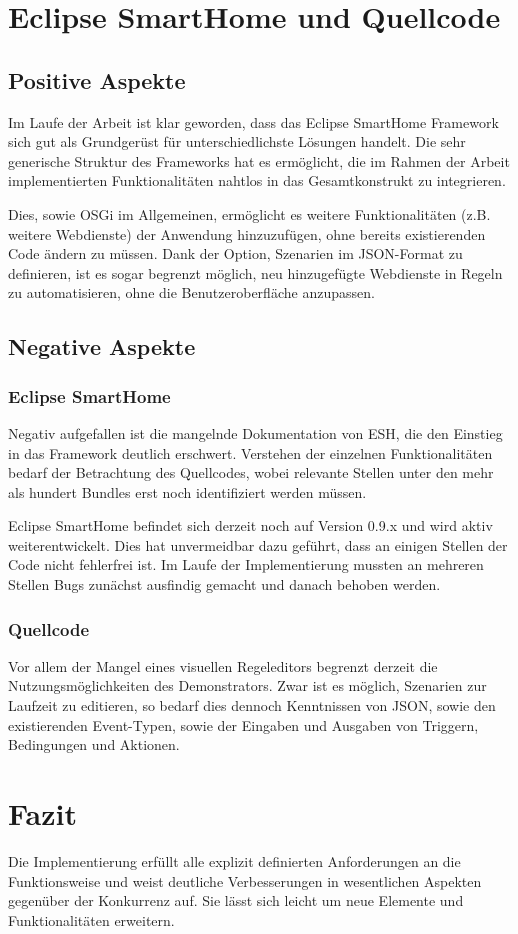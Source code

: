 \section{Eclipse SmartHome und Quellcode}
\subsection{Positive Aspekte}
Im Laufe der Arbeit ist klar geworden, dass das Eclipse SmartHome Framework sich gut als Grundgerüst für unterschiedlichste Lösungen handelt. Die sehr generische Struktur des Frameworks hat es ermöglicht, die im Rahmen der Arbeit implementierten Funktionalitäten nahtlos in das Gesamtkonstrukt zu integrieren. 

Dies, sowie OSGi im Allgemeinen, ermöglicht es weitere Funktionalitäten (z.B. weitere Webdienste) der Anwendung hinzuzufügen, ohne bereits existierenden Code ändern zu müssen. Dank der Option, Szenarien im JSON-Format zu definieren, ist es sogar begrenzt möglich, neu hinzugefügte Webdienste in Regeln zu automatisieren, ohne die Benutzeroberfläche anzupassen.

\subsection{Negative Aspekte}
\subsubsection{Eclipse SmartHome}
Negativ aufgefallen ist die mangelnde Dokumentation von ESH, die den Einstieg in das Framework deutlich erschwert. Verstehen der einzelnen Funktionalitäten bedarf der Betrachtung des Quellcodes, wobei relevante Stellen unter den mehr als hundert Bundles erst noch identifiziert werden müssen. 

Eclipse SmartHome befindet sich derzeit noch auf Version 0.9.x und wird aktiv weiterentwickelt. Dies hat unvermeidbar dazu geführt, dass an einigen Stellen der Code nicht fehlerfrei ist. Im Laufe der Implementierung mussten an mehreren Stellen Bugs zunächst ausfindig gemacht und danach behoben werden.

\subsubsection{Quellcode}
Vor allem der Mangel eines visuellen Regeleditors begrenzt derzeit die Nutzungsmöglichkeiten des Demonstrators. Zwar ist es möglich, Szenarien zur Laufzeit zu editieren, so bedarf dies dennoch Kenntnissen von JSON, sowie den existierenden Event-Typen, sowie der Eingaben und Ausgaben von Triggern, Bedingungen und Aktionen.

\section{Fazit}
Die Implementierung erfüllt alle explizit definierten Anforderungen an die Funktionsweise und weist deutliche Verbesserungen in wesentlichen Aspekten gegenüber der Konkurrenz auf. Sie lässt sich leicht um neue Elemente und Funktionalitäten erweitern.

